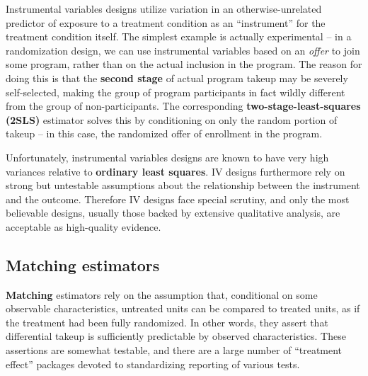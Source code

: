 Instrumental variables designs utilize variation in an
otherwise-unrelated predictor of exposure to a treatment condition
as an ``instrument'' for the treatment condition itself.
The simplest example is actually experimental --
in a randomization design, we can use instrumental variables
based on an \textit{offer} to join some program,
rather than on the actual inclusion in the program.\cite{angrist2001instrumental}
The reason for doing this is that the \textbf{second stage}
of actual program takeup may be severely self-selected,
making the group of program participants in fact
wildly different from the group of non-participants.
The corresponding \textbf{two-stage-least-squares (2SLS)} estimator
solves this by conditioning on only the random portion of takeup --
in this case, the randomized offer of enrollment in the program.

Unfortunately, instrumental variables designs are known
to have very high variances relative to \textbf{ordinary least squares}.\cite{young2017consistency}
IV designs furthermore rely on strong but untestable assumptions
about the relationship between the instrument and the outcome.\cite{bound1995problems}
Therefore IV designs face special scrutiny,
and only the most believable designs,
usually those backed by extensive qualitative analysis,
are acceptable as high-quality evidence.

\subsection{Matching estimators}

\textbf{Matching} estimators rely on the assumption that,
conditional on some observable characteristics,
untreated units can be compared to treated units,
as if the treatment had been fully randomized.
In other words, they assert that differential takeup
is sufficiently predictable by observed characteristics.
These assertions are somewhat testable,
and there are a large number of ``treatment effect''
packages devoted to standardizing reporting of various tests.

